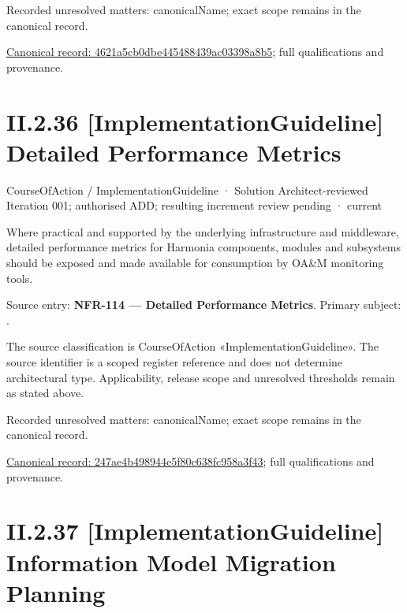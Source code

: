 {\small Recorded unresolved matters: canonicalName; exact scope remains in the canonical record.}\par
{\footnotesize \href{../../../../../../../continuum/strategy/course-of-action/implementation-guideline/4621a5cb0dbe445488439ac03398a8b5.md}{Canonical record: 4621a5cb0dbe445488439ac03398a8b5}; full qualifications and provenance.}\par
\section*{II.2.36 [ImplementationGuideline] Detailed Performance Metrics}
\label{navigation:II.2.36}

\label{element:247ae4b498944e5f80c638fc958a3f43}
{\small CourseOfAction / ImplementationGuideline · Solution Architect-reviewed Iteration 001; authorised ADD; resulting increment review pending · current}\par

Where practical and supported by the underlying infrastructure and middleware, detailed performance metrics for Harmonia components, modules and subsystems should be exposed and made available for consumption by OA\&M monitoring tools.



Source entry: \textbf{NFR-114 — Detailed Performance Metrics}. Primary subject: \texttt{}.



The source classification is CourseOfAction «ImplementationGuideline». The source identifier is a scoped register reference and does not determine architectural type. Applicability, release scope and unresolved thresholds remain as stated above.


{\small Recorded unresolved matters: canonicalName; exact scope remains in the canonical record.}\par
{\footnotesize \href{../../../../../../../continuum/strategy/course-of-action/implementation-guideline/247ae4b498944e5f80c638fc958a3f43.md}{Canonical record: 247ae4b498944e5f80c638fc958a3f43}; full qualifications and provenance.}\par
\section*{II.2.37 [ImplementationGuideline] Information Model Migration Planning}
\label{navigation:II.2.37}

